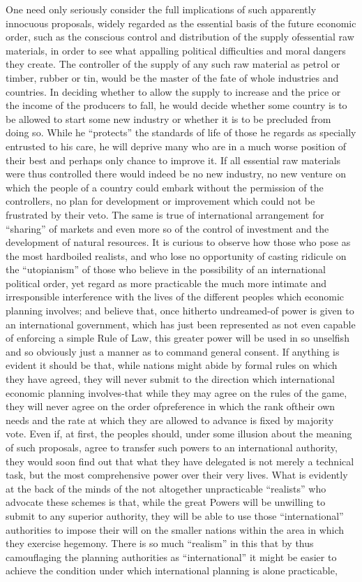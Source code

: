 \documentclass[11pt,openany]{book}
\begin{document}
One need only seriously consider the full implications of such apparently innocuous proposals, widely regarded as the essential basis of the future economic order, such as the conscious control and distribution of the supply ofessential raw materials, in order to see what appalling political difficulties and moral dangers they create. The controller of the supply of any such raw material as petrol or timber, rubber or tin, would be the master of the fate of whole industries and countries. In deciding whether to allow the supply to increase and the price or the income of the producers to fall, he would decide whether some country is to be allowed to start some new industry or whether it is to be precluded from doing so. While he ``protects'' the standards of life of those he regards as specially entrusted to his care, he will deprive many who are in a much worse position of their best and perhaps only chance to improve it. If all essential raw materials were thus controlled there would indeed be no new industry, no new venture on which the people of a country could embark without the permission of the controllers, no plan for development or improvement which could not be frustrated by their veto. The same is true of international arrangement for ``sharing'' of markets and even more so of the control of investment and the development of natural resources. It is curious to observe how those who pose as the most hardboiled realists, and who lose no opportunity of casting ridicule on the ``utopianism'' of those who believe in the possibility of an international political order, yet regard as more practicable the much more intimate and irresponsible interference with the lives of the different peoples which economic planning involves; and believe that, once hitherto undreamed-of power is given to an international government, which has just been represented as not even capable of enforcing a simple Rule of Law, this greater power will be used in so unselfish and so obviously just a manner as to command general consent. If anything is evident it should be that, while nations might abide by formal rules on which they have agreed, they will never submit to the direction which international economic planning involves-that while they may agree on the rules of the game, they will never agree on the order ofpreference in which the rank oftheir own needs and the rate at which they are allowed to advance is fixed by majority vote. Even if, at first, the peoples should, under some illusion about the meaning of such proposals, agree to transfer such powers to an international authority, they would soon find out that what they have delegated is not merely a technical task, but the most comprehensive power over their very lives. What is evidently at the back of the minds of the not altogether unpracticable ``realists'' who advocate these schemes is that, while the great Powers will be unwilling to submit to any superior authority, they will be able to use those ``international'' authorities to impose their will on the smaller nations within the area in which they exercise hegemony. There is so much ``realism'' in this that by thus camouflaging the planning authorities as ``international'' it might be easier to achieve the condition under which international planning is alone practicable, 
\end{document}
